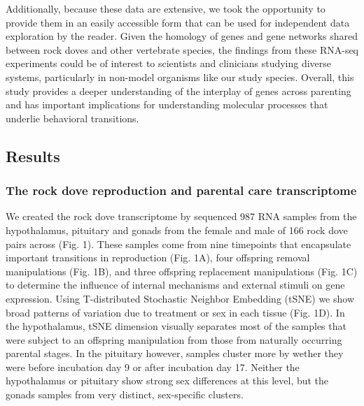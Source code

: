 Additionally, because these data are extensive, we took the opportunity
to provide them in an easily accessible form that can be used for
independent data exploration by the reader. Given the homology of genes
and gene networks shared between rock doves and other vertebrate
species, the findings from these RNA-seq experiments could be of
interest to scientists and clinicians studying diverse systems,
particularly in non-model organisms like our study species. Overall,
this study provides a deeper understanding of the interplay of genes
across parenting and has important implications for understanding
molecular processes that underlie behavioral transitions.

\hypertarget{results}{%
\subsection{Results}\label{results}}

\hypertarget{the-rock-dove-reproduction-and-parental-care-transcriptome}{%
\subsubsection{The rock dove reproduction and parental care
transcriptome}\label{the-rock-dove-reproduction-and-parental-care-transcriptome}}

We created the rock dove transcriptome by sequenced 987 RNA samples from
the hypothalamus, pituitary and gonads from the female and male of 166
rock dove pairs across (Fig. 1). These samples come from nine timepoints
that encapsulate important transitions in reproduction (Fig. 1A), four
offspring removal manipulations (Fig. 1B), and three offspring
replacement manipulations (Fig. 1C) to determine the influence of
internal mechanisms and external stimuli on gene expression. Using
T-distributed Stochastic Neighbor Embedding (tSNE) we show broad
patterns of variation due to treatment or sex in each tissue (Fig. 1D).
In the hypothalamus, tSNE dimension visually separates most of the
samples that were subject to an offspring manipulation from those from
naturally occurring parental stages. In the pituitary however, samples
cluster more by wether they were before incubation day 9 or after
incubation day 17. Neither the hypothalamus or pituitary show strong sex
differences at this level, but the gonads samples from very distinct,
sex-specific clusters.

